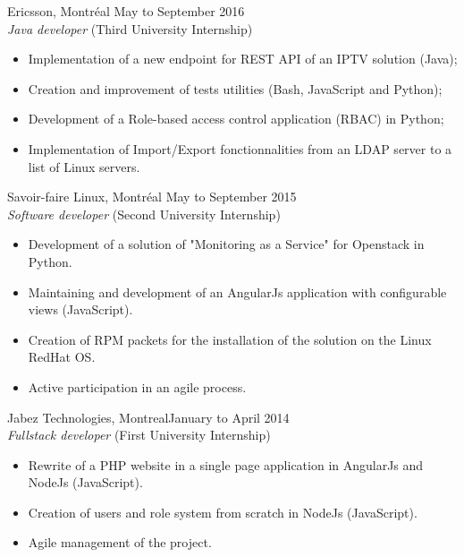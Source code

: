 \documentclass{res}
\newcommand{\inEnglish}[1]{#1}
\begin{document}
\begin{resume}
{	
}

\inEnglish{
	Ericsson, Montréal\footnotemark
	\hfill May to September 2016 \\
	{\sl Java developer} \hfill (Third University Internship)
	\vspace{0.05in}

	\begin{itemize} \itemsep -2pt
		\item Implementation of a new endpoint for REST API of an IPTV solution (Java);
		\item Creation and improvement of tests utilities (Bash, JavaScript and Python);
		\item Development of a Role-based access control application (RBAC) in Python;
		\item Implementation of Import/Export fonctionnalities from an LDAP server to a list of Linux servers.
	\end{itemize}

	Savoir-faire Linux, Montréal
	\hfill May to September 2015 \\
	{\sl Software developer} \hfill (Second University Internship)
	\vspace{0.05in}

	\begin{itemize} \itemsep -2pt
		\item Development of a solution of "Monitoring as a Service" for Openstack in Python.
		\item Maintaining and development of an AngularJs application with configurable views (JavaScript).
		\item Creation of RPM packets for the installation of the solution on the Linux RedHat OS.
		\item Active participation in an agile process.
	\end{itemize}

	Jabez Technologies, Montreal\footnotemark[\value{footnote}]
	\hfill January to April 2014 \\
	{\sl Fullstack developer} \hfill (First University Internship)
	\vspace{0.05in}

	\begin{itemize} \itemsep -2pt
		\item Rewrite of a PHP website in a single page application in AngularJs and NodeJs (JavaScript).
		\item Creation of users and role system from scratch in NodeJs (JavaScript).
		\item Agile management of the project.
	\end{itemize}

}
\end{resume}
\end{document}
